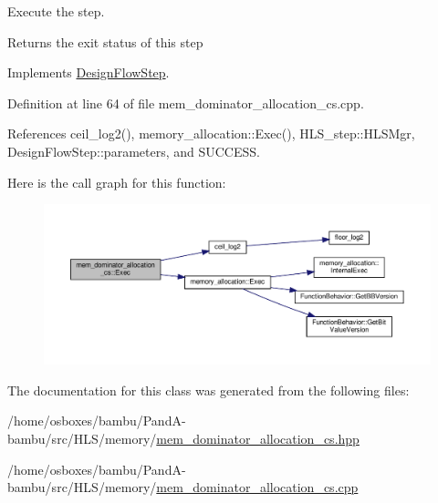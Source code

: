 Execute the step. 

\begin{DoxyReturn}{Returns}
the exit status of this step 
\end{DoxyReturn}


Implements \hyperlink{classDesignFlowStep_a77d7e38493016766098711ea24f60b89}{Design\+Flow\+Step}.



Definition at line 64 of file mem\+\_\+dominator\+\_\+allocation\+\_\+cs.\+cpp.



References ceil\+\_\+log2(), memory\+\_\+allocation\+::\+Exec(), H\+L\+S\+\_\+step\+::\+H\+L\+S\+Mgr, Design\+Flow\+Step\+::parameters, and S\+U\+C\+C\+E\+SS.

Here is the call graph for this function\+:
\nopagebreak
\begin{figure}[H]
\begin{center}
\leavevmode
\includegraphics[width=350pt]{d7/d1e/classmem__dominator__allocation__cs_a60f6b1d90b9bf041ba3fe87a486b49ec_cgraph}
\end{center}
\end{figure}


The documentation for this class was generated from the following files\+:\begin{DoxyCompactItemize}
\item 
/home/osboxes/bambu/\+Pand\+A-\/bambu/src/\+H\+L\+S/memory/\hyperlink{mem__dominator__allocation__cs_8hpp}{mem\+\_\+dominator\+\_\+allocation\+\_\+cs.\+hpp}\item 
/home/osboxes/bambu/\+Pand\+A-\/bambu/src/\+H\+L\+S/memory/\hyperlink{mem__dominator__allocation__cs_8cpp}{mem\+\_\+dominator\+\_\+allocation\+\_\+cs.\+cpp}\end{DoxyCompactItemize}
